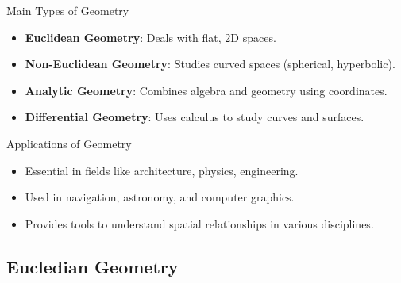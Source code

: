 \documentclass{beamer}
\begin{document}
\begin{frame}{Main Types of Geometry}
    \begin{itemize}
        \item \textbf{Euclidean Geometry}: Deals with flat, 2D spaces.
        \item \textbf{Non-Euclidean Geometry}: Studies curved spaces (spherical, hyperbolic).
        \item \textbf{Analytic Geometry}: Combines algebra and geometry using coordinates.
        \item \textbf{Differential Geometry}: Uses calculus to study curves and surfaces.
    \end{itemize}
\end{frame}

\begin{frame}{Applications of Geometry}
    \begin{itemize}
        \item Essential in fields like architecture, physics, engineering.
        \item Used in navigation, astronomy, and computer graphics.
        \item Provides tools to understand spatial relationships in various disciplines.
    \end{itemize}
\end{frame}

\subsection{Eucledian Geometry} 
\end{document}
